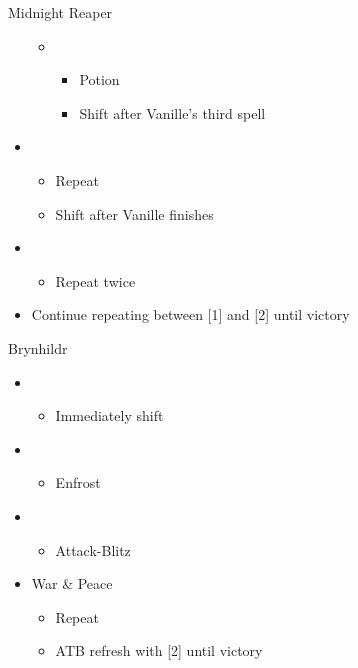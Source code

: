 \documentclass{report}
\begin{document}
\begin{battle}{Midnight Reaper}
\begin{itemize}
\begin{itemize}
\begin{itemize}
        \end{itemize}
        \item \sixth
        \begin{itemize}
            \item Potion
            \item Shift after Vanille's third spell
        \end{itemize}
    \end{itemize}
    \item \first
    \begin{itemize}
        \item Repeat
        \item Shift after Vanille finishes
    \end{itemize}
    \item \second
    \begin{itemize}
        \item Repeat twice
    \end{itemize}
    \item Continue repeating between [1] and [2] until victory
\end{itemize}
\end{battle}

\begin{battle}{Brynhildr}
\begin{itemize}
    \item \first
    \begin{itemize}
        \item Immediately shift
    \end{itemize}
    \item \third
    \begin{itemize}
        \item Enfrost
    \end{itemize}
    \item \first
    \begin{itemize}
        \item Attack-Blitz
    \end{itemize}
    \item War \& Peace
    \begin{itemize}
        \item Repeat
        \item ATB refresh with [2] until victory
    \end{itemize}
\end{itemize}
\end{battle}
\chapter{}
\end{document}
